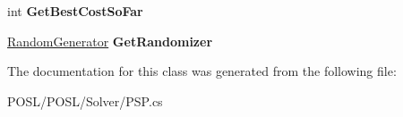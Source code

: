 \begin{DoxyCompactItemize}
\item 
\mbox{\label{classPOSL_1_1Solver_1_1PSP_a86b2bbbee27faf03d50f5b388729902c}} 
int {\bfseries Get\+Best\+Cost\+So\+Far}
\item 
\mbox{\label{classPOSL_1_1Solver_1_1PSP_a3ecf6e0ce956decabfd0aa39d69fbf32}} 
\hyperlink{classPOSL_1_1Tools_1_1RandomGenerator}{Random\+Generator} {\bfseries Get\+Randomizer}
\end{DoxyCompactItemize}


The documentation for this class was generated from the following file\+:\begin{DoxyCompactItemize}
\item 
P\+O\+S\+L/\+P\+O\+S\+L/\+Solver/P\+S\+P.\+cs\end{DoxyCompactItemize}
